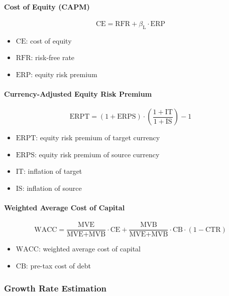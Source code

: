 \paragraph{Cost of Equity (CAPM)}

$$
\text{CE} = \text{RFR} + \beta_{\text{L}} \cdot \text{ERP}
$$

\begin{itemize}
  \item[] $\text{CE}$: cost of equity
  \item[] $\text{RFR}$: risk-free rate
  \item[] $\text{ERP}$: equity risk premium
\end{itemize}

\paragraph{Currency-Adjusted Equity Risk Premium}

$$
\text{ERPT} = (1 + \text{ERPS}) \cdot \left( \frac{1 + \text{IT}}{1 + \text{IS}} \right) - 1
$$

\begin{itemize}
  \item[] $\text{ERPT}$: equity risk premium of target currency
  \item[] $\text{ERPS}$: equity risk premium of source currency
  \item[] $\text{IT}$: inflation of target
  \item[] $\text{IS}$: inflation of source
\end{itemize}

\paragraph{Weighted Average Cost of Capital}

$$
\text{WACC} = \frac{\text{MVE}}{\text{MVE} + \text{MVB}} \cdot \text{CE} + \frac{\text{MVB}}{\text{MVE} + \text{MVB}} \cdot \text{CB} \cdot (1 - \text{CTR})
$$

\begin{itemize}
  \item[] $\text{WACC}$: weighted average cost of capital
  \item[] $\text{CB}$: pre-tax cost of debt
\end{itemize}

\subsubsection{Growth Rate Estimation}

